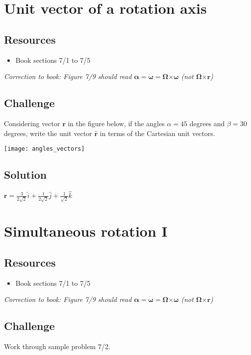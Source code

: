 \iffalse
\newpage
\section{Unit vector of a rotation axis}

\subsection*{Resources}
\begin{itemize}
    \item Book sections 7/1 to 7/5
\end{itemize}

\emph{Correction to book: Figure 7/9 should read $\bm{\alpha} = \bm{\dot{\omega}} = \bm{\Omega} \bm{\times} \bm{\omega}$ (not $\bm{\Omega} \bm{\times} \bm{r}$)}

\subsection*{Challenge}
Considering vector $\bm{r}$ in the figure below, if the angles $\alpha = 45$ degrees and $\beta = 30$ degrees, write the unit vector $\bm{\hat{r}}$ in terms of the Cartesian unit vectors.

\texttt{[image: angles\_vectors]}

\subsection*{Solution}
$\bm{r} = \frac{3}{2\sqrt{2}} \hat{i} + \frac{1}{2\sqrt{2}} \hat{j} + \frac{1}{\sqrt{2}} \hat{k}$


\newpage
\section{Simultaneous rotation I}

\subsection*{Resources}
\begin{itemize}
    \item Book sections 7/1 to 7/5
\end{itemize}

\emph{Correction to book: Figure 7/9 should read $\bm{\alpha} = \bm{\dot{\omega}} = \bm{\Omega} \bm{\times} \bm{\omega}$ (not $\bm{\Omega} \bm{\times} \bm{r}$)}

\subsection*{Challenge}
Work through sample problem 7/2.




